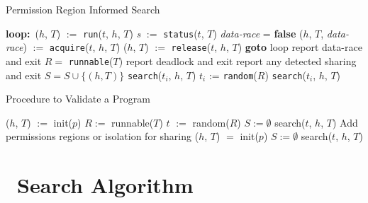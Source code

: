 \begin{algorithm}
\caption{Permission Region Informed Search}\label{algo:search}
\begin{algorithmic}[1]
  \State \textbf{loop:}\ ($h$, $T$) $:=$ \texttt{run}($t$, $h$, $T$)\label{loc:run}
  \State
  \State \textit{s} $:=$ \texttt{status}($t$, $T$)
  \State \textit{data-race} = \textbf{false}
   \label{loc:PR}
  \State ($h$, $T$, \textit{data-race}) $:=$ \texttt{acquire}($t$, $h$, $T$)\label{loc:acquire}
  \State ($h$, $T$) $:=$ \texttt{release}($t$, $h$, $T$)\label{loc:release}
  \State \textbf{goto} loop
  \EndIf
  \State
  \label{loc:datarace}
  \State report data-race and exit
  \EndIf
  \State
  \State $R = $ \texttt{runnable}($T$)
  \label{loc:deadlock}
  \State report deadlock and exit
  \Else
  \State report any detected sharing and exit\label{loc:term}
  \EndIf
  \EndIf
  \State
  \label{loc:visited}
  \State $S = S \cup \{(h, T)\}$
  \label{loc:prsched}
  \State \texttt{search}($t_i$, $h$, $T$)
  \EndFor
  \Else
  \State $t_i$ := \texttt{random}($R$)\label{loc:rand}
  \State \texttt{search}($t_i$, $h$, $T$)
  \EndIf
  \EndIf
\EndFunction
\end{algorithmic}
\end{algorithm}

\begin{algorithm}
\caption{Procedure to Validate a Program}\label{algo:validate}
\begin{algorithmic}[l]
  \State ($h$, $T$) $:=$ init($p$)
  \State $R := $ runnable($T$)
  \State $t$ $:=$ random($R$)
  \State $S := \emptyset$
  \State search($t$, $h$, $T$)
  \State Add permissions regions or isolation for sharing
  \State ($h$, $T$) $=$ init($p$)
  \State $S := \emptyset$
  \State search($t$, $h$, $T$)
  \EndWhile
  \EndProcedure
\end{algorithmic}
\end{algorithm}

\section{\jpfhj\ Search Algorithm}

